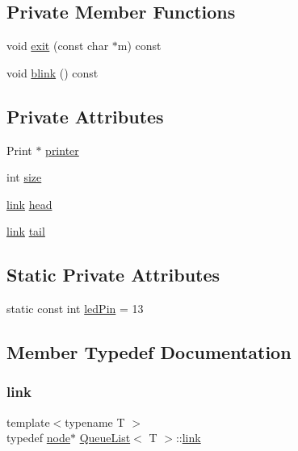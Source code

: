\subsection*{Private Member Functions}
\begin{DoxyCompactItemize}
\item 
void \mbox{\hyperlink{class_queue_list_a898426929c28b3ef4029ac5f54d6d415}{exit}} (const char $\ast$m) const
\item 
void \mbox{\hyperlink{class_queue_list_aaae70e1aed37aca1dfbd59334d0f73fe}{blink}} () const
\end{DoxyCompactItemize}
\subsection*{Private Attributes}
\begin{DoxyCompactItemize}
\item 
Print $\ast$ \mbox{\hyperlink{class_queue_list_a83629c4a8da7cc0c3a60e55f7b445c47}{printer}}
\item 
int \mbox{\hyperlink{class_queue_list_a9f11f3ab5e0f0833d1bb498eb521d4fa}{size}}
\item 
\mbox{\hyperlink{class_queue_list_a2dbbea18dafe3bc1585072a26cee8e68}{link}} \mbox{\hyperlink{class_queue_list_ac7ae88c334c9a55d3e77c8b2aa181a72}{head}}
\item 
\mbox{\hyperlink{class_queue_list_a2dbbea18dafe3bc1585072a26cee8e68}{link}} \mbox{\hyperlink{class_queue_list_ab707604463ec22d18eb44bb36d2bf273}{tail}}
\end{DoxyCompactItemize}
\subsection*{Static Private Attributes}
\begin{DoxyCompactItemize}
\item 
static const int \mbox{\hyperlink{class_queue_list_a8f3aa75e676514f61c31eb9f657f526a}{led\+Pin}} = 13
\end{DoxyCompactItemize}


\subsection{Member Typedef Documentation}
\mbox{\label{class_queue_list_a2dbbea18dafe3bc1585072a26cee8e68}} 
\subsubsection{\texorpdfstring{link}{link}}
{\footnotesize\ttfamily template$<$typename T $>$ \\
typedef \mbox{\hyperlink{struct_queue_list_1_1node}{node}}$\ast$ \mbox{\hyperlink{class_queue_list}{Queue\+List}}$<$ T $>$\+::\mbox{\hyperlink{class_queue_list_a2dbbea18dafe3bc1585072a26cee8e68}{link}}\hspace{0.3cm}{\ttfamily [private]}}

